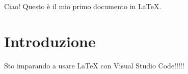 \documentclass{article}  %
\begin{document}
Ciao! Questo è il mio primo documento in \LaTeX.

\section{Introduzione}
Sto imparando a usare LaTeX con Visual Studio Code!!!!!
\end{document}

